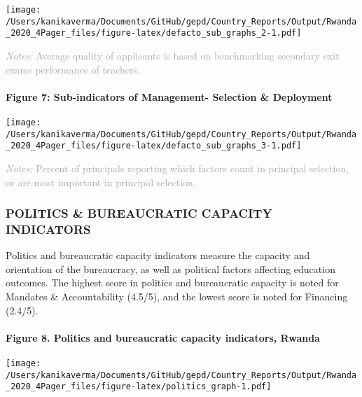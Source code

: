 \documentclass[twocolumn]{article}
\let\oldparagraph\paragraph
\renewcommand{\paragraph}[1]{\oldparagraph{#1}\mbox{}}
\begin{document}
\texttt{[image: /Users/kanikaverma/Documents/GitHub/gepd/Country\_Reports/Output/Rwanda\_2020\_4Pager\_files/figure-latex/defacto\_sub\_graphs\_2-1.pdf]}

{\scriptsize
    \textcolor{darkgray}{\textit{Notes:} Average quality of applicants is based on benchmarking secondary exit exams performance of teachers.}
  }

\hypertarget{figure-7-sub-indicators-of-management--selection-deployment}{%
\paragraph{Figure 7: Sub-indicators of Management- Selection \&
Deployment}\label{figure-7-sub-indicators-of-management--selection-deployment}}

\texttt{[image: /Users/kanikaverma/Documents/GitHub/gepd/Country\_Reports/Output/Rwanda\_2020\_4Pager\_files/figure-latex/defacto\_sub\_graphs\_3-1.pdf]}

{\scriptsize
    \textcolor{darkgray}{\textit{Notes:} Percent of principals reporting which factors count in principal selection, or are most important in principal selection.}
  }

\vfill\null

\hypertarget{politics-bureaucratic-capacity-indicators}{%
\subsubsection{\texorpdfstring{\textbf{POLITICS \& BUREAUCRATIC CAPACITY
INDICATORS}}{POLITICS \& BUREAUCRATIC CAPACITY INDICATORS}}\label{politics-bureaucratic-capacity-indicators}}

Politics and bureaucratic capacity indicators measure the capacity and
orientation of the bureaucracy, as well as political factors affecting
education outcomes. The highest score in politics and bureaucratic
capacity is noted for Mandates \& Accountability (4.5/5), and the lowest
score is noted for Financing (2.4/5).

\hypertarget{figure-8.-politics-and-bureaucratic-capacity-indicators-rwanda}{%
\paragraph{Figure 8. Politics and bureaucratic capacity indicators,
Rwanda}\label{figure-8.-politics-and-bureaucratic-capacity-indicators-rwanda}}

\texttt{[image: /Users/kanikaverma/Documents/GitHub/gepd/Country\_Reports/Output/Rwanda\_2020\_4Pager\_files/figure-latex/politics\_graph-1.pdf]}
\end{document}
